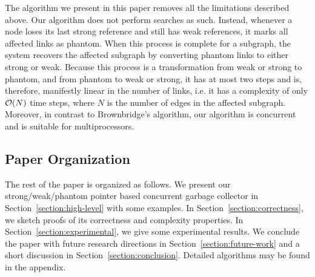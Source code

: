 The algorithm we present in this paper removes all the limitations described above.
Our algorithm does not perform searches as such.
Instead, whenever a node
loses its last strong reference and still has weak references, it marks all
affected links as phantom. When this process is complete for
a subgraph, the system recovers the affected subgraph by converting phantom
links to either strong or weak. Because this process is a transformation from
weak or strong to phantom, and from phantom to weak or strong, it has at most
two steps and is, therefore, manifestly linear in the number of links, i.e. it
has a complexity of only ${\cal O}(N)$ time steps,
where $N$ is the number of edges in the
affected subgraph. Moreover, in contrast to Brownbridge's algorithm, our algorithm is concurrent and is suitable for multiprocessors.



\subsection{Paper Organization}
The rest of the paper is organized as follows. We present %
our strong/weak/phantom pointer based concurrent garbage collector in Section~\ref{section:high-level} with some examples. %
In Section~\ref{section:correctness}, we sketch proofs of its correctness and complexity properties. In Section~\ref{section:experimental}, we give some experimental results. We conclude the paper with future research directions in Section~\ref{section:future-work} and a short discussion in Section~\ref{section:conclusion}. Detailed algorithms may be found in the appendix.

